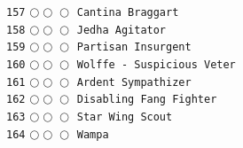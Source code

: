 \documentclass[a4paper,landscape]{article}
\begin{document}
\begin{multicols*}{5}
\texttt{157} \(\bigcirc\!\bigcirc\!\bigcirc\)  \texttt{Cantina Braggart} \vspace{-0.3mm}\\ 
\texttt{158} \(\bigcirc\!\bigcirc\!\bigcirc\)  \texttt{Jedha Agitator} \vspace{-0.3mm}\\ 
\texttt{159} \(\bigcirc\!\bigcirc\!\bigcirc\)  \texttt{Partisan Insurgent} \vspace{-0.3mm}\\ 
\texttt{160} \(\bigcirc\!\bigcirc\!\bigcirc\)  \texttt{Wolffe - Suspicious Veter} \vspace{-0.3mm}\\ 
\texttt{161} \(\bigcirc\!\bigcirc\!\bigcirc\)  \texttt{Ardent Sympathizer} \vspace{-0.3mm}\\ 
\texttt{162} \(\bigcirc\!\bigcirc\!\bigcirc\)  \texttt{Disabling Fang Fighter} \vspace{-0.3mm}\\ 
\texttt{163} \(\bigcirc\!\bigcirc\!\bigcirc\)  \texttt{Star Wing Scout} \vspace{-0.3mm}\\ 
\texttt{164} \(\bigcirc\!\bigcirc\!\bigcirc\)  \texttt{Wampa} \vspace{-0.3mm}\\ 

\end{multicols*}
\end{document}
